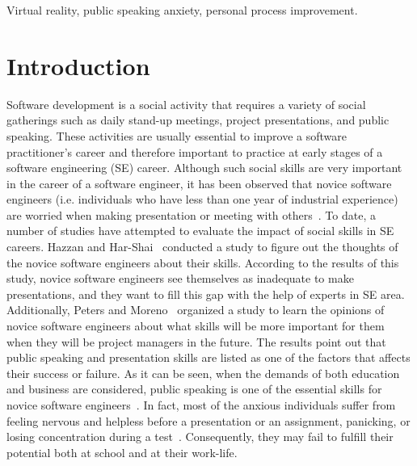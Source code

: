 \documentclass{llncs}
\begin{document}
\begin{keywords}
Virtual reality, public speaking anxiety, personal process improvement.
\end{keywords}
\newpage

\section{Introduction}

Software development is a social activity that requires a variety of social gatherings such as daily stand-up meetings, project presentations, and public speaking. These activities are usually essential to improve a software practitioner's career and therefore important to practice at early stages of a software engineering (SE) career. Although such social skills are very important in the career of a software engineer, it has been observed that novice software engineers (i.e. individuals who have less than one year of industrial experience) are worried when making presentation or meeting with others~\cite{bernardez2014controlled}. To date, a number of studies have attempted to evaluate the impact of social skills in SE careers. Hazzan and Har-Shai~\cite{hazzan2014teaching} conducted a study to figure out the thoughts of the novice software engineers about their skills. According to the results of this study, novice software engineers see themselves as inadequate to make presentations, and they want to fill this gap with the help of experts in SE area. Additionally, Peters and Moreno~\cite{peters2015educating} organized a study to learn the opinions of novice software engineers about what skills will be more important for them when they will be project managers in the future. The results point out that public speaking and presentation skills are listed as one of the factors that affects their success or failure. As it can be seen, when the demands of both education and business are considered, public speaking is one of the essential skills for novice software engineers~\cite{darmuki2017evaluating}. In fact, most of the anxious individuals suffer from feeling nervous and helpless before a presentation or an assignment, panicking, or losing concentration during a test~\cite{vitasari2011pilot}. Consequently, they may fail to fulfill their potential both at school and at their work-life.
\end{document}
